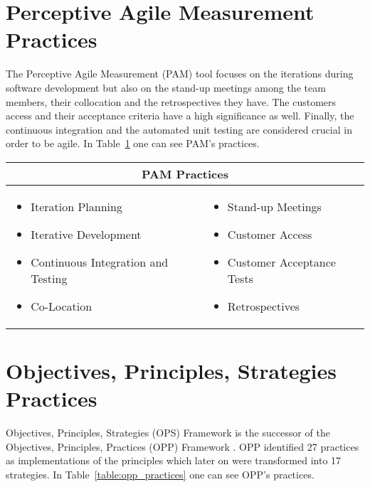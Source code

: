 \section[PAM Practices]{Perceptive Agile Measurement Practices}
The Perceptive Agile Measurement (PAM) tool focuses on the iterations during software development but also on the stand-up meetings among the team members, their collocation and the retrospectives they have. The customers access and their acceptance criteria have a high significance as well. Finally, the continuous integration and the automated unit testing are considered crucial in order to be agile. In Table~\ref{table:pam_practices} one can see PAM's practices.

\begin{table} [H]
  \begin{tabular}{| p{6cm} p{6cm} |}
    \hline
    \multicolumn{2}{|c|}{\textbf{PAM Practices}}  \\ \hline
    	\begin{itemize} \item Iteration Planning \item Iterative Development \item Continuous Integration and Testing \item Co-Location \end{itemize} &
     \begin{itemize} \item Stand-up Meetings \item Customer Access \item Customer Acceptance Tests \item Retrospectives \end{itemize}  \\ \hline
  \end{tabular}
  \label{table:pam_practices}
\end{table}

\section{Objectives, Principles, Strategies Practices}
Objectives, Principles, Strategies (OPS) Framework is the successor of the Objectives, Principles, Practices (OPP) Framework \cite{opp}. OPP identified 27 practices as implementations of the principles which later on were transformed into 17 strategies. In Table~\ref{table:opp_practices} one can see OPP's practices. 

